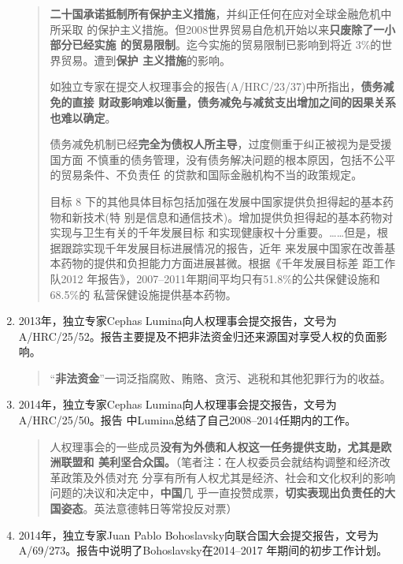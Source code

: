 \begin{enumerate}
\begin{quotation}
    \textbf{二十国承诺抵制所有保护主义措施}，并纠正任何在应对全球金融危机中所采取
    的保护主义措施。但2008世界贸易自危机开始以来\textbf{只废除了一小部分已经实施
      的贸易限制}。迄今实施的贸易限制已影响到将近 3\%的世界贸易。遭到\textbf{保护
      主义措施}的影响。

    如独立专家在提交人权理事会的报告(A/HRC/23/37)中所指出，\textbf{债务减免的直接
      财政影响难以衡量，债务减免与减贫支出增加之间的因果关系也难以确定}。

    债务减免机制已经\textbf{完全为债权人所主导}，过度侧重于纠正被视为是受援国方面
    不慎重的债务管理，没有债务解决问题的根本原因，包括不公平的贸易条件、不负责任
    的贷款和国际金融机构不当的政策规定。

    目标 8 下的其他具体目标包括加强在发展中国家提供负担得起的基本药物和新技术(特
    别是信息和通信技术)。增加提供负担得起的基本药物对实现与卫生有关的千年发展目标
    和实现健康权十分重要。……但是，根据跟踪实现千年发展目标进展情况的报告，近年
    来发展中国家在改善基本药物的提供和负担能力方面进展甚微。根据《千年发展目标差
    距工作队2012 年报告》，2007--2011年期间平均只有51.8\%的公共保健设施和68.5\%的
    私营保健设施提供基本药物。
   \end{quotation}

\item 2013年，独立专家Cephas Lumina向人权理事会提交报告，文号为A/HRC/25/52。报告主要提及不把非法资金归还来源国对享受人权的负面影响。
  \begin{quotation} “\textbf{非法资金}”一词泛指腐败、贿赂、贪污、逃税和其他犯罪行为的收益。
  \end{quotation}

\item 2014年，独立专家Cephas Lumina向人权理事会提交报告，文号为A/HRC/25/50。报告
  中Lumina总结了自己2008--2014任期内的工作。
  \begin{quotation}
    人权理事会的一些成员\textbf{没有为外债和人权这一任务提供支助，尤其是欧洲联盟和
      美利坚合众国。}（笔者注：在人权委员会就结构调整和经济改革政策及外债对充
    分享有所有人权尤其是经济、社会和文化权利的影响问题的决议和决定中，\textbf{中国}几
    乎一直投赞成票，\textbf{切实表现出负责任的大国姿态}。英法意德韩日等常投反对票）
  \end{quotation}

\item 2014年，独立专家Juan Pablo Bohoslavsky向联合国大会提交报告，文号为A/69/273。报告中说明了Bohoslavsky在2014--2017 年期间的初步工作计划。


\end{enumerate}
